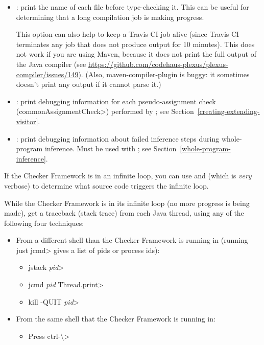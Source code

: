 \begin{itemize}

\item {}: print the name of each file before type-checking it.
This can be useful for determining that a long compilation job is making
progress.

This option can also help to keep a Travis CI job alive (since Travis CI
terminates any job that does not produce output for 10 minutes).
This does not work if you are using Maven, because it does not print
the full output of the Java compiler (see \url{https://github.com/codehaus-plexus/plexus-compiler/issues/149}).
(Also, maven-compiler-plugin is buggy: it sometimes
doesn't print any output if it cannot parse it.)

\item {}: print debugging information for each
pseudo-assignment check (\<commonAssignmentCheck>) performed by
; see
Section~\ref{creating-extending-visitor}.

\item {}: print debugging information
about failed inference steps during whole-program inference. Must
be used with ; see Section~\ref{whole-program-inference}.

\end{itemize}

If the Checker Framework is in an infinite loop, you can use
 and  (which is \emph{very} verbose)
to determine what source code triggers the infinite loop.

While the Checker Framework is in its infinite loop (no more progress is
being made), get a traceback (stack trace) from each Java thread,
using any of the following four techniques:

\begin{itemize}
  \item From a different shell than the Checker Framework is running in
    (running just \<jcmd> gives a list of pids or process ids):
  \begin{itemize}
    \item \<jstack \emph{pid}>
    \item \<jcmd \emph{pid} Thread.print>
    \item \<kill -QUIT \emph{pid}>
  \end{itemize}
  \item From the same shell that the Checker Framework is running in:
  \begin{itemize}
    \item Press \<ctrl-\textbackslash>
  \end{itemize}
\end{itemize}



